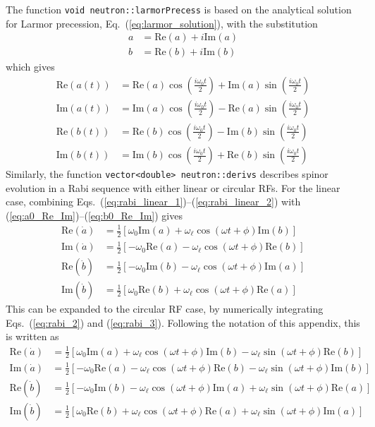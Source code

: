 The function \texttt{void neutron::larmorPrecess} is based on the analytical solution for Larmor precession, Eq.~(\ref{eq:larmor_solution}), with the substitution
%
\begin{align}
    a &= \text{Re}(a)+i\text{Im}(a)\label{eq:a0_Re_Im}\\
    b &= \text{Re}(b)+i\text{Im}(b)\label{eq:b0_Re_Im}
\end{align}
%
which gives 
%
\begin{align}
    \text{Re}(a(t)) &= \text{Re}(a)\cos\left(\frac{i\omega_0 t}{2}\right)+\text{Im}(a)\sin\left(\frac{i\omega_0 t}{2}\right)\\
    \text{Im}(a(t)) &= \text{Im}(a)\cos\left(\frac{i\omega_0 t}{2}\right)-\text{Re}(a)\sin\left(\frac{i\omega_0 t}{2}\right)\\
    \text{Re}(b(t)) &= \text{Re}(b)\cos\left(\frac{i\omega_0 t}{2}\right)-\text{Im}(b)\sin\left(\frac{i\omega_0 t}{2}\right)\\
    \text{Im}(b(t)) &= \text{Im}(b)\cos\left(\frac{i\omega_0 t}{2}\right)+\text{Re}(b)\sin\left(\frac{i\omega_0 t}{2}\right)
\end{align}
%
Similarly, the function \texttt{vector<double> neutron::derivs} describes spinor evolution in a Rabi sequence with either linear or circular RFs. For the linear case, combining Eqs.~(\ref{eq:rabi_linear_1})--(\ref{eq:rabi_linear_2}) with (\ref{eq:a0_Re_Im})--(\ref{eq:b0_Re_Im}) gives
%
\begin{align}
    \text{Re}(\dot{a}) &= \frac{1}{2}\left[\omega_0\text{Im}(a) +\omega_\ell\cos(\omega t +\phi)\text{Im}(b) \right] \\
    \text{Im}(\dot{a}) &= \frac{1}{2}\left[-\omega_0\text{Re}(a)-\omega_\ell\cos(\omega t+\phi)\text{Re}(b) \right] \\
    \text{Re}(\dot{b}) &= \frac{1}{2}\left[-\omega_0\text{Im}(b)-\omega_\ell\cos(\omega t+\phi)\text{Im}(a) \right] \\
    \text{Im}(\dot{b}) &= \frac{1}{2}\left[\omega_0\text{Re}(b) +\omega_\ell\cos(\omega t +\phi)\text{Re}(a) \right]
\end{align}
%
This can be expanded to the circular RF case, by numerically integrating  Eqs.~(\ref{eq:rabi_2}) and (\ref{eq:rabi_3}). Following the notation of this appendix, this is written as
%
\begin{align}
    \text{Re}(\dot{a}) &= \frac{1}{2}\left[\omega_0\text{Im}(a) +\omega_\ell\cos(\omega t +\phi)\text{Im}(b) -\omega_\ell\sin(\omega t +\phi)\text{Re}(b) \right]\\
    \text{Im}(\dot{a}) &= \frac{1}{2}\left[-\omega_0\text{Re}(a)-\omega_\ell\cos(\omega t+\phi)\text{Re}(b) -\omega_\ell\sin(\omega t+\phi)\text{Im}(b) \right] \\
    \text{Re}(\dot{b}) &= \frac{1}{2}\left[-\omega_0\text{Im}(b)-\omega_\ell\cos(\omega t+\phi)\text{Im}(a) +\omega_\ell\sin(\omega t+\phi)\text{Re}(a) \right] \\
    \text{Im}(\dot{b}) &= \frac{1}{2}\left[\omega_0\text{Re}(b) +\omega_\ell\cos(\omega t +\phi)\text{Re}(a) +\omega_\ell\sin(\omega t+\phi)\text{Im}(a) \right]
\end{align}
